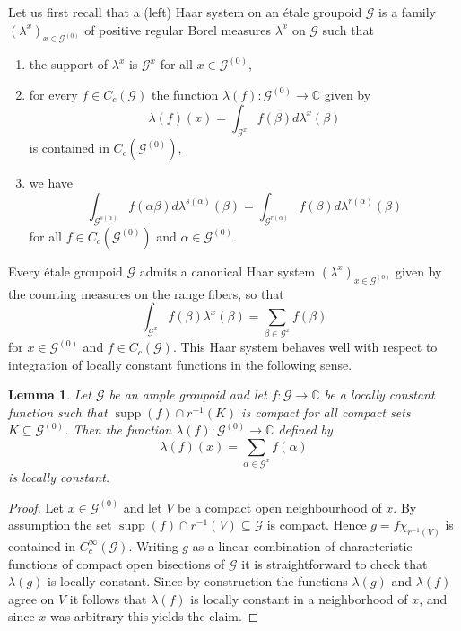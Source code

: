 \documentclass{amsart}
\newtheorem{lemma}[thm]{Lemma}
\newcommand{\G}{\mathcal{G}}
\newcommand{\ccinfty}{C_c^\infty}
\begin{document}
Let us first recall that a (left) Haar system on an \'etale groupoid $ \G $ is a family $ (\lambda^x)_{x \in \G^{(0)}} $ of positive regular Borel measures $ \lambda^x $ on $ \G $ such that 
\begin{enumerate}
\item the support of $ \lambda^x $ is $ \G^x $ for all $ x \in \G^{(0)} $, 
\item for every $ f \in C_c(\G) $ the function $ \lambda(f): \G^{(0)} \rightarrow \mathbb{C} $ given by 
$$
\lambda(f)(x) = \int_{\G^x} f(\beta) d\lambda^x(\beta) 
$$
is contained in $ C_c(\G^{(0)}) $,
\item we have 
$$
\int_{\G^{s(\alpha)}} f(\alpha \beta) d\lambda^{s(\alpha)}(\beta) = \int_{\G^{r(\alpha)}} f(\beta) d\lambda^{r(\alpha)}(\beta)
$$
for all $ f \in C_c(\G^{(0)}) $ and $ \alpha \in \G^{(0)} $. 
\end{enumerate}

Every \'etale groupoid $ \G $ admits a canonical Haar system $ (\lambda^x)_{x \in \G^{(0)}} $ given by the counting measures on the range fibers, so that 
$$
\int_{\G^x} f(\beta) \lambda^x(\beta) = \sum_{\beta \in \G^x} f(\beta) 
$$
for $ x \in \G^{(0)} $ and $ f \in C_c(\G) $. 
This Haar system behaves well with respect to integration of locally constant functions in the following sense. 

\begin{lemma} \label{lemma: integration over fiber is continuous for functions with proper support}
Let $ \G $ be an ample groupoid and let $ f: \G \rightarrow \mathbb{C} $ be a locally constant function such that $ \operatorname{supp}(f) \cap r^{-1}(K) $ is compact for all compact 
sets $ K \subseteq \G^{(0)} $. Then the function $ \lambda(f): \G^{(0)} \rightarrow \mathbb{C} $ defined by 
$$ 
\lambda(f)(x) = \sum_{\alpha\in \G^x}f(\alpha)
$$ 
is locally constant.
\end{lemma}

\begin{proof}
Let $ x \in \G^{(0)} $ and let $ V $ be a compact open neighbourhood of $ x $. By assumption the set $ \operatorname{supp}(f) \cap r^{-1}(V)\subseteq \G $ is compact. Hence $ g = f \chi_{r^{-1}(V)} $ is contained in $ \ccinfty(\G) $. Writing $ g $ as a linear combination of characteristic functions of compact open bisections of $ \G $ it is straightforward to check that $ \lambda(g) $ is locally constant. 
Since by construction the functions $ \lambda(g) $ and $ \lambda(f) $ agree on $ V $ it follows that $ \lambda(f) $ is locally constant in a neighborhood of $ x $, and since $ x $ was arbitrary this yields the claim. 
\end{proof}
\end{document}
